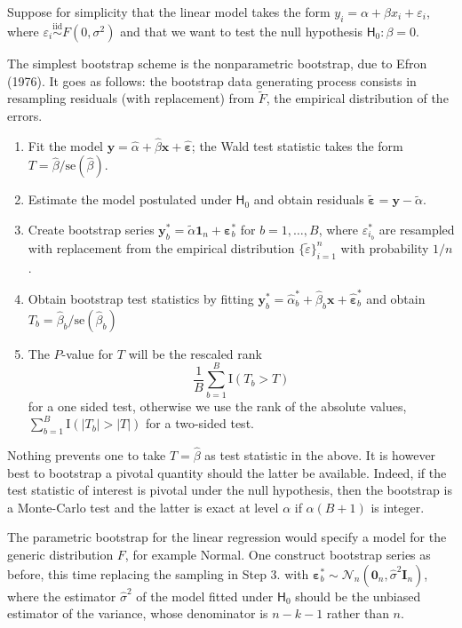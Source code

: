 \documentclass[]{book}
\providecommand{\tightlist}{%
  \setlength{\itemsep}{0pt}\setlength{\parskip}{0pt}}
\begin{document}
Suppose for simplicity that the linear model takes the form
\(y_i=\alpha+\beta x_i + \varepsilon_i\), where
\(\varepsilon_i \stackrel{\mathrm{iid}}{\sim}F(0,\sigma^2)\) and that we
want to test the null hypothesis \(\mathsf{H}_0: \beta=0\).

The simplest bootstrap scheme is the nonparametric bootstrap, due to
Efron (1976). It goes as follows: the bootstrap data generating process
consists in resampling residuals (with replacement) from \(\tilde{F}\),
the empirical distribution of the errors.

\begin{enumerate}
\def\labelenumi{\arabic{enumi}.}
\tightlist
\item
  Fit the model
  \(\boldsymbol{y}=\widehat{\alpha} + \widehat{\beta}\boldsymbol{x} + \widehat{\boldsymbol{\varepsilon}}\);
  the Wald test statistic takes the form
  \(T=\hat{\beta}/\mathrm{se}(\hat{\beta})\).
\item
  Estimate the model postulated under \(\mathsf{H}_0\) and obtain
  residuals
  \(\widetilde{\boldsymbol{\varepsilon}}=\boldsymbol{y}-\widetilde{\alpha}\).
\item
  Create bootstrap series
  \(\boldsymbol{y}_b^* = \widetilde{\alpha}\boldsymbol{1}_n + \boldsymbol{\varepsilon}_b^*\)
  for \(b=1, \ldots, B\), where \(\varepsilon_{i_b}^*\) are resampled
  with replacement from the empirical distribution
  \(\{\widetilde{\varepsilon}\}_{i=1}^n\) with probability \(1/n\).
\item
  Obtain bootstrap test statistics by fitting
  \(\boldsymbol{y}_b^*=\widehat{\alpha}_{b}^* + \widehat{\beta}_{b}\boldsymbol{x} + \widehat{\boldsymbol{\varepsilon}}_b^*\)
  and obtain \(T_b=\hat{\beta}_b/\mathrm{se}(\hat{\beta}_b)\)
\item
  The \(P\)-value for \(T\) will be the rescaled rank
  \[\frac{1}{B}\sum_{b=1}^B \mathrm{I}(T_b>T)\] for a one sided test,
  otherwise we use the rank of the absolute values,
  \(\sum_{b=1}^B \mathrm{I}(|T_b|>|T|)\) for a two-sided test.
\end{enumerate}

Nothing prevents one to take \(T=\hat{\beta}\) as test statistic in the
above. It is however best to bootstrap a pivotal quantity should the
latter be available. Indeed, if the test statistic of interest is
pivotal under the null hypothesis, then the bootstrap is a Monte-Carlo
test and the latter is exact at level \(\alpha\) if \(\alpha(B+1)\) is
integer.

The parametric bootstrap for the linear regression would specify a model
for the generic distribution \(F\), for example Normal. One construct
bootstrap series as before, this time replacing the sampling in Step 3.
with
\(\boldsymbol{\varepsilon}^*_b \sim \mathcal{N}_n(\boldsymbol{0}_n, \widehat{\sigma}^2\mathbf{I}_n)\),
where the estimator \(\widehat{\sigma}^2\) of the model fitted under
\(\mathsf{H}_0\) should be the unbiased estimator of the variance, whose
denominator is \(n-k-1\) rather than \(n\).
\end{document}
